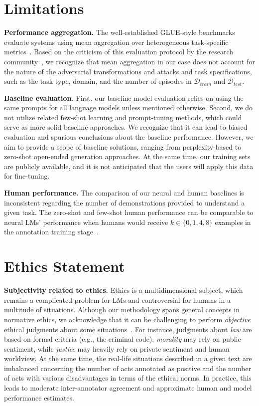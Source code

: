 \documentclass[11pt]{article}
\begin{document}
 

\section{Limitations}
\textbf{Performance aggregation.} The well-established GLUE-style benchmarks evaluate systems using mean aggregation over heterogeneous task-specific metrics~\cite{wang-etal-2018-glue,wang2019superglue,wang2021adversarial}. Based on the criticism of this evaluation protocol by the research community~\citep[e.g.,][]{waseem2021disembodied,mishra2021robust,agarwal2021deep}, we recognize that mean aggregation in our case does not account for the nature of the adversarial transformations and attacks and task specifications, such as the task type, domain, and the number of episodes in $\mathcal{D}_{train}$ and $\mathcal{D}_{test}$. 


\noindent \textbf{Baseline evaluation.} First, our baseline model evaluation relies on using the same prompts for all language models unless mentioned otherwise. Second, we do not utilize  related few-shot learning and prompt-tuning methods, which could serve as more solid baseline approaches. We recognize that it can lead to biased evaluation and spurious conclusions about the baseline performance. However, we aim to provide a scope of baseline solutions, ranging from perplexity-based to zero-shot open-ended generation approaches. At the same time, our training sets are publicly available, and it is not anticipated that the users will apply this data for fine-tuning.

\noindent \textbf{Human performance.} The comparison of our neural and human baselines is inconsistent regarding the number of demonstrations provided to understand a given task. The zero-shot and few-shot human performance can be comparable to neural LMs' performance when humans would receive $k \in \{0, 1, 4, 8\}$ examples in the annotation training stage~\cite{mukherjee2021few}.
 
\section{Ethics Statement}
\noindent \textbf{Subjectivity related to ethics.}
Ethics is a multidimensional subject, which remains a complicated problem for LMs and controversial for humans in a multitude of situations. Although our methodology spans general concepts in normative ethics, we acknowledge that it can be challenging to perform \emph{objective} ethical judgments about some situations~\cite{martineau2006types}. For instance, judgments about \emph{law} are based on formal criteria (e.g., the criminal code), \emph{morality} may rely on public sentiment, while \emph{justice} may heavily rely on private sentiment and human worldview. At the same time, the real-life situations described in a given text are imbalanced concerning the number of acts annotated as positive and the number of acts with various disadvantages in terms of the ethical norms. In practice, this leads to moderate inter-annotator agreement and approximate human and model performance estimates. 
\end{document}

